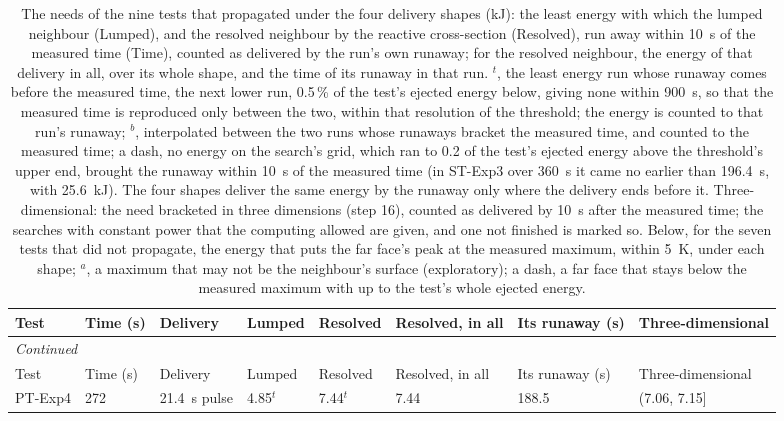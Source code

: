 {\scriptsize\setlength{\tabcolsep}{3pt}
\begin{longtable}{p{}p{}p{}p{}p{}p{}p{}p{}}
\caption{The needs of the nine tests that propagated under the four delivery shapes (kJ): the least energy with which the lumped neighbour (Lumped), and the resolved neighbour by the reactive cross-section (Resolved), run away within 10~s of the measured time (Time), counted as delivered by the run's own runaway; for the resolved neighbour, the energy of that delivery in all, over its whole shape, and the time of its runaway in that run. $^{t}$, the least energy run whose runaway comes before the measured time, the next lower run, 0.5\,\% of the test's ejected energy below, giving none within 900~s, so that the measured time is reproduced only between the two, within that resolution of the threshold; the energy is counted to that run's runaway; $^{b}$, interpolated between the two runs whose runaways bracket the measured time, and counted to the measured time; a dash, no energy on the search's grid, which ran to 0.2 of the test's ejected energy above the threshold's upper end, brought the runaway within 10~s of the measured time (in ST-Exp3 over 360~s it came no earlier than 196.4~s, with 25.6~kJ). The four shapes deliver the same energy by the runaway only where the delivery ends before it. Three-dimensional: the need bracketed in three dimensions (step 16), counted as delivered by 10~s after the measured time; the searches with constant power that the computing allowed are given, and one not finished is marked so. Below, for the seven tests that did not propagate, the energy that puts the far face's peak at the measured maximum, within 5~K, under each shape; $^{a}$, a maximum that may not be the neighbour's surface (exploratory); a dash, a far face that stays below the measured maximum with up to the test's whole ejected energy.}\label{tab:s-needs}\\
\toprule
Test & Time (s) & Delivery & Lumped & Resolved & Resolved, in all & Its runaway (s) & Three-dimensional \\
\midrule
\endfirsthead
\multicolumn{8}{l}{\textit{Continued}} \\
\toprule
Test & Time (s) & Delivery & Lumped & Resolved & Resolved, in all & Its runaway (s) & Three-dimensional \\
\midrule
\endhead
PT-Exp4 & 272 & 21.4~s pulse & 4.85$^{t}$ & 7.44$^{t}$ & 7.44 & 188.5 & (7.06, 7.15] \\

\end{longtable}}
